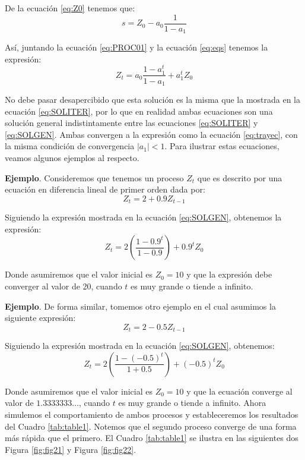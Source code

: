 \documentclass[
]{book}
\begin{document}
De la ecuación \eqref{eq:Z0} tenemos que:
\begin{equation}
    s = Z_0 - a_0 \frac{1}{1 - a_1}
\label{eq:eqs}
\end{equation}

Así, juntando la ecuación \eqref{eq:PROC01} y la ecuación \eqref{eq:eqs} tenemos la expresión:
\begin{equation}
    Z_t = a_0 \frac{1 - a^t_1}{1 - a_1} + a^t_1 Z_0
\label{eq:SOLGEN}
\end{equation}

No debe pasar desapercibido que esta solución es la misma que la mostrada en la ecuación \eqref{eq:SOLITER}, por lo que en realidad ambas ecuaciones son una solución general indistintamente entre las ecuaciones \eqref{eq:SOLITER} y \eqref{eq:SOLGEN}. Ambas convergen a la expresión como la ecuación \eqref{eq:trayec}, con la misma condición de convergencia \(|a_1| < 1\). Para ilustrar estas ecuaciones, veamos algunos ejemplos al respecto.

\textbf{Ejemplo}. Consideremos que tenemos un proceso \(Z_t\) que es descrito por una ecuación en diferencia lineal de primer orden dada por:
\begin{equation}
    Z_t = 2 + 0.9 Z_{t-1}
\label{eq:ex1}
\end{equation}

Siguiendo la expresión mostrada en la ecuación \eqref{eq:SOLGEN}, obtenemos la expresión:
\begin{equation}
    Z_t = 2 \left( \frac{1 - 0.9^{t}}{1 - 0.9} \right) + 0.9^t Z_0
\label{eq:ex2}
\end{equation}

Donde asumiremos que el valor inicial es \(Z_0 = 10\) y que la expresión debe converger al valor de 20, cuando \(t\) es muy grande o tiende a infinito.

\textbf{Ejemplo}. De forma similar, tomemos otro ejemplo en el cual asumimos la siguiente expresión:
\begin{equation}
    Z_t = 2 - 0.5 Z_{t-1}
\label{eq:ex3}
\end{equation}

Siguiendo la expresión mostrada en la ecuación \eqref{eq:SOLGEN}, obtenemos:
\begin{equation}
    Z_t = 2 \left( \frac{1 - (-0.5)^{t}}{1 + 0.5} \right) + (-0.5)^t Z_0
\label{eq:ex4}
\end{equation}

Donde asumiremos que el valor inicial es \(Z_0 = 10\) y que la ecuación converge al valor de \(1.3333333 \ldots\), cuando \(t\) es muy grande o tiende a infinito. Ahora simulemos el comportamiento de ambos procesos y estableceremos los resultados del Cuadro \ref{tab:table1}. Notemos que el segundo proceso converge de una forma más rápida que el primero. El Cuadro \ref{tab:table1} se ilustra en las siguientes dos Figura \ref{fig:fig21} y Figura \ref{fig:fig22}.
\end{document}
